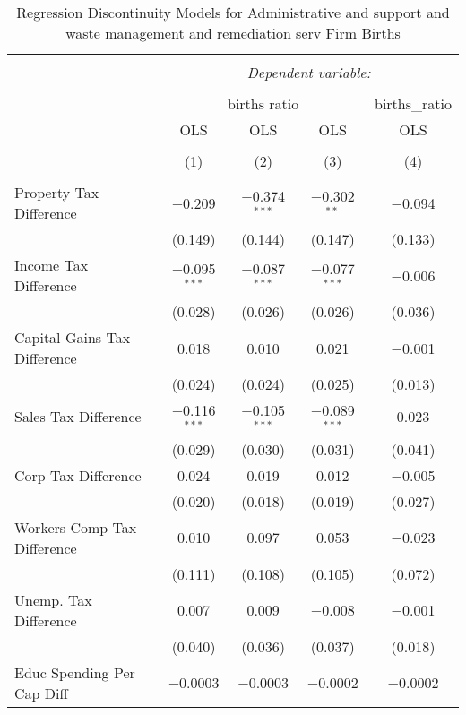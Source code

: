 
\begin{table}[!htbp] \centering 
  \caption{Regression Discontinuity Models for  Administrative and support and waste management and remediation serv Firm Births} 
  \label{56rd} 
\begin{tabular}{@{\extracolsep{5pt}}lcccc} 
\\[-1.8ex]\hline 
\hline \\[-1.8ex] 
 & \multicolumn{4}{c}{\textit{Dependent variable:}} \\ 
\cline{2-5} 
\\[-1.8ex] & \multicolumn{3}{c}{births ratio} & births\_ratio \\ 
 & OLS & OLS & OLS & OLS \\ 
\\[-1.8ex] & (1) & (2) & (3) & (4)\\ 
\hline \\[-1.8ex] 
 Property Tax Difference & $-$0.209 & $-$0.374$^{***}$ & $-$0.302$^{**}$ & $-$0.094 \\ 
  & (0.149) & (0.144) & (0.147) & (0.133) \\ 
  Income Tax Difference & $-$0.095$^{***}$ & $-$0.087$^{***}$ & $-$0.077$^{***}$ & $-$0.006 \\ 
  & (0.028) & (0.026) & (0.026) & (0.036) \\ 
  Capital Gains Tax Difference & 0.018 & 0.010 & 0.021 & $-$0.001 \\ 
  & (0.024) & (0.024) & (0.025) & (0.013) \\ 
  Sales Tax Difference & $-$0.116$^{***}$ & $-$0.105$^{***}$ & $-$0.089$^{***}$ & 0.023 \\ 
  & (0.029) & (0.030) & (0.031) & (0.041) \\ 
  Corp Tax Difference & 0.024 & 0.019 & 0.012 & $-$0.005 \\ 
  & (0.020) & (0.018) & (0.019) & (0.027) \\ 
  Workers Comp Tax Difference & 0.010 & 0.097 & 0.053 & $-$0.023 \\ 
  & (0.111) & (0.108) & (0.105) & (0.072) \\ 
  Unemp. Tax Difference & 0.007 & 0.009 & $-$0.008 & $-$0.001 \\ 
  & (0.040) & (0.036) & (0.037) & (0.018) \\ 
  Educ Spending Per Cap Diff & $-$0.0003 & $-$0.0003 & $-$0.0002 & $-$0.0002 \\ 

\end{tabular}
\end{table}
